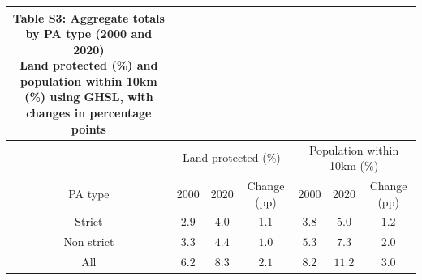 \begin{longtable}{ccccccc}
\caption*{
{\large Table S3: Aggregate totals by PA type (2000 and 2020)} \\ 
{\small Land protected (\%) and population within 10km (\%) using GHSL, with changes in percentage points}
} \\ 
\toprule
 & \multicolumn{3}{c}{Land protected (\%)} & \multicolumn{3}{c}{Population within 10km (\%)} \\ 
\cmidrule(lr){2-4} \cmidrule(lr){5-7}
PA type & 2000 & 2020 & Change (pp) & 2000 & 2020 & Change (pp) \\ 
\midrule\addlinespace[2.5pt]
Strict & $2.9$ & $4.0$ & $1.1$ & $3.8$ & $5.0$ & $1.2$ \\ 
Non strict & $3.3$ & $4.4$ & $1.0$ & $5.3$ & $7.3$ & $2.0$ \\ 
All & $6.2$ & $8.3$ & $2.1$ & $8.2$ & $11.2$ & $3.0$ \\ 
\bottomrule
\end{longtable}

